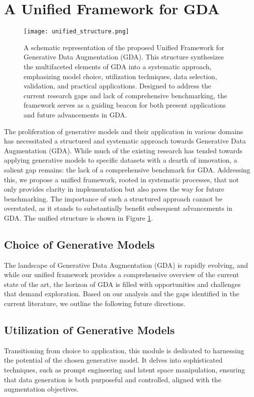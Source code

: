 \documentclass[preprint,12pt,authoryear]{elsarticle}
\begin{document}
\section{A Unified Framework for GDA}

\begin{figure}
    \centering
    \centerline{\texttt{[image: unified\_structure.png]}}
    \caption{A schematic representation of the proposed Unified Framework for Generative Data Augmentation (GDA). This structure synthesizes the multifaceted elements of GDA into a systematic approach, emphasizing model choice, utilization techniques, data selection, validation, and practical applications. Designed to address the current research gaps and lack of comprehensive benchmarking, the framework serves as a guiding beacon for both present applications and future advancements in GDA.}
    \label{fig:unified}
\end{figure}

The proliferation of generative models and their application in various domains has necessitated a structured and systematic approach towards Generative Data Augmentation (GDA). While much of the existing research has tended towards applying generative models to specific datasets with a dearth of innovation, a salient gap remains: the lack of a comprehensive benchmark for GDA. Addressing this, we propose a unified framework, rooted in systematic processes, that not only provides clarity in implementation but also paves the way for future benchmarking. The importance of such a structured approach cannot be overstated, as it stands to substantially benefit subsequent advancements in GDA. The unified structure is shown in Figure \ref{fig:unified}.

\subsection{Choice of Generative Models}
The landscape of Generative Data Augmentation (GDA) is rapidly evolving, and while our unified framework provides a comprehensive overview of the current state of the art, the horizon of GDA is filled with opportunities and challenges that demand exploration. Based on our analysis and the gaps identified in the current literature, we outline the following future directions.

\subsection{Utilization of Generative Models}
Transitioning from choice to application, this module is dedicated to harnessing the potential of the chosen generative model. It delves into sophisticated techniques, such as prompt engineering and latent space manipulation, ensuring that data generation is both purposeful and controlled, aligned with the augmentation objectives.
\end{document}
